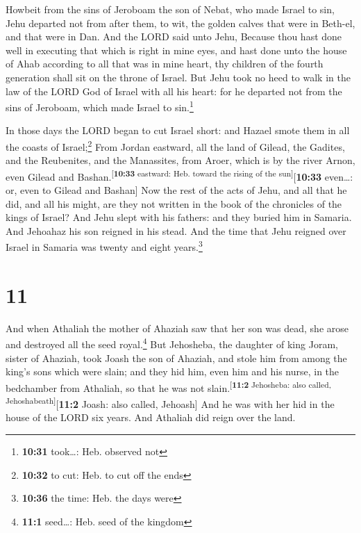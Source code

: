  Howbeit from the sins of Jeroboam the son of Nebat, who
made Israel to sin, Jehu departed not from after them, to wit, the
golden calves that were in Beth-el, and that were in Dan.
 And the LORD said unto Jehu, Because thou hast done well
in executing that which is right in mine eyes, and hast done unto the
house of Ahab according to all that was in mine heart, thy children of
the fourth generation shall sit on the throne of Israel. 
But Jehu took no heed to walk in the law of the LORD God of Israel with
all his heart: for he departed not from the sins of Jeroboam, which made
Israel to sin.\footnote{\textbf{10:31} took\ldots: Heb. observed not}

 In those days the LORD began to cut Israel short: and
Hazael smote them in all the coasts of Israel;\footnote{\textbf{10:32}
  to cut: Heb. to cut off the ends}  From Jordan
eastward, all the land of Gilead, the Gadites, and the Reubenites, and
the Manassites, from Aroer, which is by the river Arnon, even Gilead and
Bashan.\textsuperscript{{[}\textbf{10:33} eastward: Heb. toward the
rising of the sun{]}}{[}\textbf{10:33} even\ldots: or, even to Gilead
and Bashan{]}  Now the rest of the acts of Jehu, and all
that he did, and all his might, are they not written in the book of the
chronicles of the kings of Israel?  And Jehu slept with
his fathers: and they buried him in Samaria. And Jehoahaz his son
reigned in his stead.  And the time that Jehu reigned
over Israel in Samaria was twenty and eight years.\footnote{\textbf{10:36}
  the time: Heb. the days were}

\hypertarget{section-10}{%
\section{11}\label{section-10}}

 And when Athaliah the mother of Ahaziah saw that her son
was dead, she arose and destroyed all the seed royal.\footnote{\textbf{11:1}
  seed\ldots: Heb. seed of the kingdom}  But Jehosheba,
the daughter of king Joram, sister of Ahaziah, took Joash the son of
Ahaziah, and stole him from among the king's sons which were slain; and
they hid him, even him and his nurse, in the bedchamber from Athaliah,
so that he was not slain.\textsuperscript{{[}\textbf{11:2} Jehosheba:
also called, Jehoshabeath{]}}{[}\textbf{11:2} Joash: also called,
Jehoash{]}  And he was with her hid in the house of the
LORD six years. And Athaliah did reign over the land.

